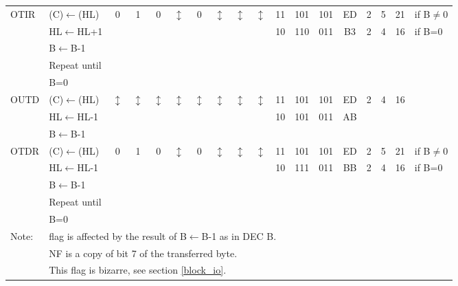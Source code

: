 \documentclass[oneside,a4paper]{book}
\begin{document}
{\begin{tabular}{llc@{ }c@{ }c@{ }c@{ }c@{ }c@{ }c@{ }cc@{ }c@{ }cccccll}
OTIR & (C)$\leftarrow$(HL) & 
	0 & 1 & 0 & $\updownarrow$\footnotemark[3] & 0 & $\updownarrow$ & $\updownarrow$\footnotemark[2] & $\updownarrow$\footnotemark[3] & 11 & 101 & 101 
	& ED & 2 & 5 & 21 & \multicolumn{2}{l}{if B$\not=$0} \\
	& HL$\leftarrow$HL+1 & \multicolumn{8}{c}{} & 10 & 110 & 011 & B3 & 2 & 4 & 16 & \multicolumn{2}{l}{if B=0} \\
	& B$\leftarrow$B-1 \\
	& Repeat until \\
	& B=0 \\

OUTD & (C)$\leftarrow$(HL) & 
	$\updownarrow$\footnotemark[1] & $\updownarrow$\footnotemark[1] & $\updownarrow$\footnotemark[1] & $\updownarrow$\footnotemark[3] & 
	$\updownarrow$\footnotemark[1] & $\updownarrow$\footnotemark[3] & $\updownarrow$\footnotemark[2] & $\updownarrow$\footnotemark[3] & 11 & 101 & 101 
	& ED & 2 & 4 & 16 & & \\
	& HL$\leftarrow$HL-1 & \multicolumn{8}{c}{} & 10 & 101 & 011 & AB & & &  & & \\
	& B$\leftarrow$B-1 \\

OTDR & (C)$\leftarrow$(HL) & 
	0 & 1 & 0 & $\updownarrow$\footnotemark[3] & 0 & $\updownarrow$\footnotemark[3] & $\updownarrow$\footnotemark[2] & $\updownarrow$\footnotemark[5] & 11 & 101 & 101 
	& ED & 2 & 5 & 21 & \multicolumn{2}{l}{if B$\not=$0} \\
	& HL$\leftarrow$HL-1 & \multicolumn{8}{c}{} & 10 & 111 & 011 & BB & 2 & 4 & 16 & \multicolumn{2}{l}{if B=0} \\
	& B$\leftarrow$B-1 \\
	& Repeat until \\
	& B=0 \\ \hline

Note: & \multicolumn{18}{l}{\parbox{12cm}{\footnotemark[1] flag is affected by the result of B$\leftarrow$B-1 as in DEC B.}} \\
      & \multicolumn{18}{l}{\parbox{12cm}{\footnotemark[2] NF is a copy of bit 7 of the transferred byte.}} \\
      & \multicolumn{18}{l}{\parbox{12cm}{\footnotemark[3] This flag is bizarre, see section \ref{block_io}.}} \\ \hline

\end{tabular}
}

\stopcontents[intrstructionsections]
\end{document}

